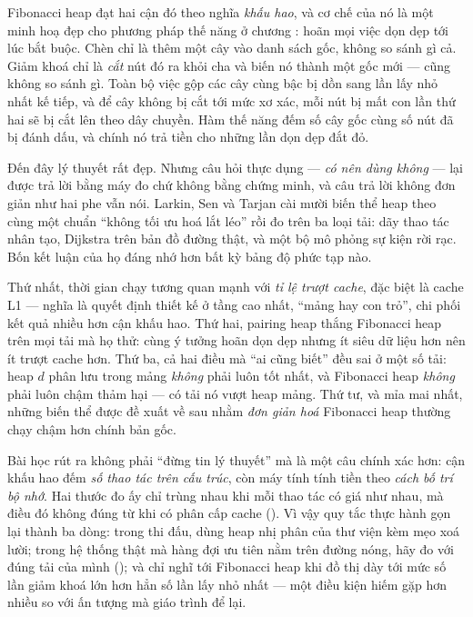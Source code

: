 \documentclass[../../algorithm.tex]{subfiles}
\begin{document}
Fibonacci heap đạt hai cận đó theo nghĩa \emph{khấu hao}, và cơ chế của nó là một minh hoạ đẹp cho phương pháp thế năng ở chương : hoãn mọi việc dọn dẹp tới lúc bắt buộc. Chèn chỉ là thêm một cây vào danh sách gốc, không so sánh gì cả. Giảm khoá chỉ là \emph{cắt} nút đó ra khỏi cha và biến nó thành một gốc mới --- cũng không so sánh gì. Toàn bộ việc gộp các cây cùng bậc bị dồn sang lần lấy nhỏ nhất kế tiếp, và để cây không bị cắt tới mức xơ xác, mỗi nút bị mất con lần thứ hai sẽ bị cắt lên theo dây chuyền. Hàm thế năng đếm số cây gốc cùng số nút đã bị đánh dấu, và chính nó trả tiền cho những lần dọn dẹp đắt đỏ.

Đến đây lý thuyết rất đẹp. Nhưng câu hỏi thực dụng --- \emph{có nên dùng không} --- lại được trả lời bằng máy đo chứ không bằng chứng minh, và câu trả lời không đơn giản như hai phe vẫn nói. Larkin, Sen và Tarjan\cite{larkin2014} cài mười biến thể heap theo cùng một chuẩn ``không tối ưu hoá lắt léo'' rồi đo trên ba loại tải: dãy thao tác nhân tạo, Dijkstra trên bản đồ đường thật, và một bộ mô phỏng sự kiện rời rạc. Bốn kết luận của họ đáng nhớ hơn bất kỳ bảng độ phức tạp nào.

Thứ nhất, thời gian chạy tương quan mạnh với \emph{tỉ lệ trượt cache}, đặc biệt là cache L1 --- nghĩa là quyết định thiết kế ở tầng cao nhất, ``mảng hay con trỏ'', chi phối kết quả nhiều hơn cận khấu hao. Thứ hai, pairing heap thắng Fibonacci heap trên mọi tải mà họ thử: cùng ý tưởng hoãn dọn dẹp nhưng ít siêu dữ liệu hơn nên ít trượt cache hơn. Thứ ba, cả hai điều mà ``ai cũng biết'' đều sai ở một số tải: heap \(d\) phân lưu trong mảng \emph{không} phải luôn tốt nhất, và Fibonacci heap \emph{không} phải luôn chậm thảm hại --- có tải nó vượt heap mảng. Thứ tư, và mỉa mai nhất, những biến thể được đề xuất về sau nhằm \emph{đơn giản hoá} Fibonacci heap thường chạy chậm hơn chính bản gốc.

Bài học rút ra không phải ``đừng tin lý thuyết'' mà là một câu chính xác hơn: cận khấu hao đếm \emph{số thao tác trên cấu trúc}, còn máy tính tính tiền theo \emph{cách bố trí bộ nhớ}. Hai thước đo ấy chỉ trùng nhau khi mỗi thao tác có giá như nhau, mà điều đó không đúng từ khi có phân cấp cache (). Vì vậy quy tắc thực hành gọn lại thành ba dòng: trong thi đấu, dùng heap nhị phân của thư viện kèm mẹo xoá lười; trong hệ thống thật mà hàng đợi ưu tiên nằm trên đường nóng, hãy đo với đúng tải của mình (); và chỉ nghĩ tới Fibonacci heap khi đồ thị dày tới mức số lần giảm khoá lớn hơn hẳn số lần lấy nhỏ nhất --- một điều kiện hiếm gặp hơn nhiều so với ấn tượng mà giáo trình để lại.
\end{document}

